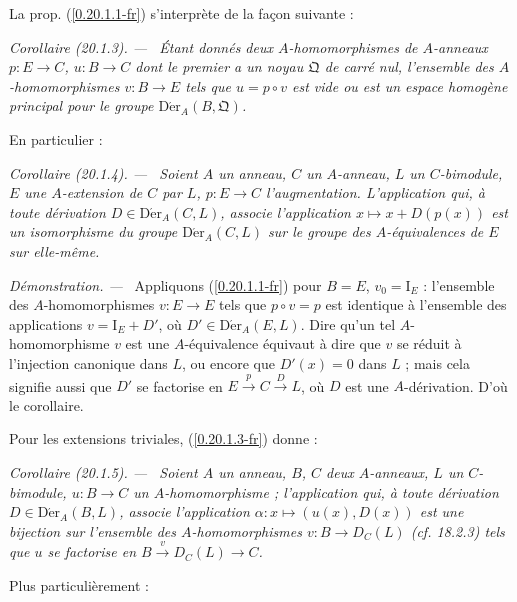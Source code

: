\documentclass[10pt,oneside]{book}
\makeatletter
\newcommand{\sref}[1]{(\ref{#1})}
\newcommand{\setmanualcurrentlabel}[1]{\def\@currentlabel{#1}}
\newcommand{\oldpage}[2][]{%
  \setcounter{footnote}{0}%
  \marginpar{\scriptsize\textbf{#1}~|~#2}\ignorespaces}
\newenvironment{corollary}[1][]{%
  \setmanualcurrentlabel{#1}\par\medskip\noindent\itshape Corollaire (#1). ---\ }{\par}
\newenvironment{proof}{%
  \par\medskip\noindent\textit{Démonstration. ---\ }}{\par}
\makeatother
\begin{document}
\oldpage[0\textsubscript{IV-1}]{118}
La prop. \sref{0.20.1.1-fr} s'interprète de la façon suivante :

\begin{corollary}[20.1.3]
\label{0.20.1.3-fr}
Étant donnés deux $A$-homomorphismes de $A$-anneaux $p:E\to C$,
$u:B\to C$ dont le premier a un noyau $\mathfrak{Q}$ de carré nul,
l'ensemble des $A$-homomorphismes $v:B\to E$ tels que $u=p\circ v$ est vide
ou est un espace homogène principal pour le groupe
$\operatorname{D\acute{e}r}_A(B,\mathfrak{Q})$.
\end{corollary}

En particulier :

\begin{corollary}[20.1.4]
\label{0.20.1.4-fr}
Soient $A$ un anneau, $C$ un $A$-anneau, $L$ un $C$-bimodule, $E$ une
$A$-extension de $C$ par $L$, $p:E\to C$ l'augmentation. L'application qui,
à toute dérivation $D\in\operatorname{D\acute{e}r}_A(C,L)$, associe l'application
$x\mapsto x+D(p(x))$ est un isomorphisme du groupe
$\operatorname{D\acute{e}r}_A(C,L)$ sur le groupe des $A$-équivalences de $E$ sur
elle-même.
\end{corollary}

\begin{proof}
Appliquons \sref{0.20.1.1-fr} pour $B=E$, $v_0=\mathrm{I}_E$ : l'ensemble
des $A$-homomorphismes $v:E\to E$ tels que $p\circ v=p$ est identique à
l'ensemble des applications $v=\mathrm{I}_E+D'$, où
$D'\in\operatorname{D\acute{e}r}_A(E,L)$. Dire qu'un tel $A$-homomorphisme $v$ est
une $A$-équivalence équivaut à dire que $v$ se réduit à l'injection canonique
dans $L$, ou encore que $D'(x)=0$ dans $L$ ; mais cela signifie aussi que
$D'$ se factorise en $E\xrightarrow{p}C\xrightarrow{D}L$, où $D$ est une
$A$-dérivation. D'où le corollaire.
\end{proof}

Pour les extensions triviales, \sref{0.20.1.3-fr} donne :

\begin{corollary}[20.1.5]
\label{0.20.1.5-fr}
Soient $A$ un anneau, $B$, $C$ deux $A$-anneaux, $L$ un $C$-bimodule,
$u:B\to C$ un $A$-homomorphisme ; l'application qui, à toute dérivation
$D\in\operatorname{D\acute{e}r}_A(B,L)$, associe l'application
$\alpha:x\mapsto(u(x),D(x))$ est une bijection sur l'ensemble des
$A$-homomorphismes $v:B\to D_C(L)$ (cf. 18.2.3) tels que $u$ se factorise en
$B\xrightarrow{v}D_C(L)\to C$.
\end{corollary}

Plus particulièrement :
\end{document}
